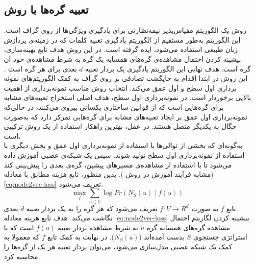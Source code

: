 \subsection{تعبیه گره‌ها با روش }
روش  یک الگوریتم مقیاس‌پذیر نیمه‌نظارتی برای یادگیری ویژگی‌ها از روی گراف است. این الگوریتم به‌طور مستقیم از الگوریتم یادگیری تعبیه کلمات \cite{mikolov2013efficient} که در زمینه‌ی پردازش زبان طبیعی استفاده می‌شود، ایده گرفته است. در این روش هدف تابع بهینه‌سازی، بیشینه کردن احتمال مشاهده‌ی گره‌های همسایه یک گره به شرط مشاهده‌ی خود آن گره است. هدف نهایی این الگوریتم یادگیری یک بردار تعبیه $d$ بعدی برای هر گره است \cite{grover2016node2vec}. این روش در ابتدا اقدام به جایگشت تصادفی بر روی گراف به کمک الگوریتم‌های نمونه برداری اول سطح و اول عمق می‌کند. انتخاب روش مناسب نمونه‌برداری از اهمیت بالایی برخوردار است. در نمونه‌برداری اول سطح، هدف اصلی استخراج تعبیه‌های مشابه برای گره‌هایی است که از قوانین ساختاری یکسانی پیروی می‌کنند، در حالی‌که نمونه‌برداری اول عمق بر ایجاد تعبیه‌های مشابه برای گره‌هایی تمرکز دارد که به‌صورت چگال به یکدیگر متصل هستند. در عمل، بهترین راهکار استفاده از یک روش ترکیبی است،\\
 به‌گونه‌ای که بخشی از توالی‌ها با استفاده از نمونه‌برداری اول عمق و بخش دیگری با استفاده از نمونه‌برداری اول سطح تولید شوند. سپس یک شبکه‌ی عصبی آموزش داده می‌شود تا با استفاده از مشاهده‌ی مسیرهای پیشین، گره‌ی بعدی را پیش‌بینی کند (مشابه فرآیند آموزش در روش ). بدین منظور، تابع هزینه مطابق با معادله \ref{eq:node2vec-loss} تعریف می‌شود.
	\begin{equation}
	\max_f \sum_{u \in V} \log Pr(N_S(u) \mid f(u))
	\label{eq:node2vec-loss}
	\end{equation}
تابع $f$ به صورت $f: V \to R^d$ تعریف می‌شود که هر گره را به یک بردار تعبیه $d$ بعدی نگاشت می‌کند. هدف تابع هزینه معادله \ref{eq:node2vec-loss} بیشینه کردن لگاریتم احتمال مشاهده گره‌های همسایه گره $u$ به شرط مشاهده بردار تعبیه $f(u)$ است که با استراتژی جستجوی $S$ بدست آمده‌اند ($N_S(u)$). در نهایت به کمک تابع $f$ که معمولا به کمک یک شبکه عصبی مدل‌سازی می‌شود، می‌توان بردار تعبیه هر یک از گره‌ها را محاسبه کرد.

